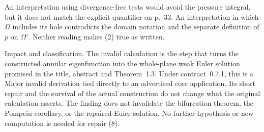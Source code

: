 \documentclass[10pt]{article}
\begin{document}
An interpretation using divergence-free tests would avoid the pressure integral, but it does not match the explicit quantifier on p. 33. An interpretation in which \(\Omega\) includes its hole contradicts the domain notation and the separate definition of \(p\) on \(\Omega'\). Neither reading makes (2) true as written.\par
Impact and classification. The invalid calculation is the step that turns the constructed annular eigenfunction into the whole-plane weak Euler solution promised in the title, abstract and Theorem 1.3. Under contract 0.7.1, this is a Major invalid derivation tied directly to an advertised core application. Its short repair and the survival of the actual construction do not change what the original calculation asserts. The finding does not invalidate the bifurcation theorem, the Pompeiu corollary, or the repaired Euler solution. No further hypothesis or new computation is needed for repair (8).\par
\end{document}
